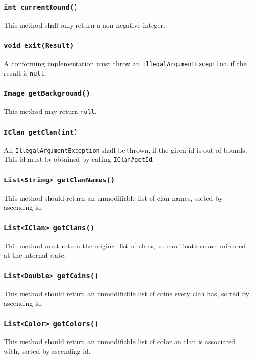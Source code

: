 \documentclass{article}
\begin{document}
\subsubsection{\texttt{int currentRound()}}
This method shall only return a non-negative integer.

\subsubsection{\texttt{void exit(Result)}}
A conforming implementation must throw an \texttt{IllegalArgumentException},
if the result is \texttt{null}.

\subsubsection{\texttt{Image getBackground()}}
This method may return \texttt{null}.

\subsubsection{\texttt{IClan getClan(int)}}
An \texttt{IllegalArgumentException} shall be thrown, if the given
id is out of bounds.
This id must be obtained by calling \texttt{IClan#getId}.

\subsubsection{\texttt{List<String> getClanNames()}}
This method should return an unmodifiable list of clan names, sorted by
ascending id.

\subsubsection{\texttt{List<IClan> getClans()}}
This method must return the original list of clans, so modifications are mirrored at the internal state.

\subsubsection{\texttt{List<Double> getCoins()}}
This method should return an unmodifiable list of coins every clan has, sorted by
ascending id.

\subsubsection{\texttt{List<Color> getColors()}}
This method should return an unmodifiable list of color an clan is associated with, sorted by
ascending id.
\end{document}
